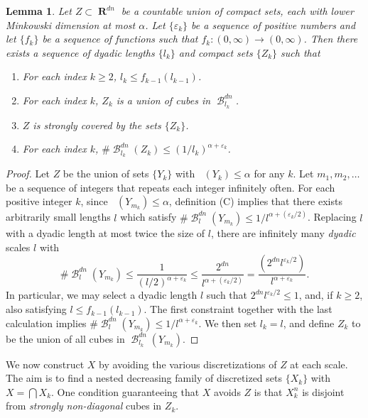 \documentclass[dvipsnames,letterpaper,12pt]{article}
\numberwithin{equation}{section}
\theoremstyle{plain}
\newtheorem{lemma}{Lemma}
\DeclareMathOperator{\lowminkdim}{\underline{\dim}_{\mathbf{M}}}
\DeclareMathOperator{\RR}{\mathbf{R}}
\DeclareMathOperator{\B}{\mathcal{B}}
\begin{document}
\begin{lemma} \label{coveringlemma}
	Let $Z \subset \RR^{dn}$ be a countable union of compact sets, each with lower Minkowski dimension at most $\alpha$. Let $\{ \varepsilon_k \}$ be a sequence of positive numbers and let $\{ f_k \}$ be a sequence of functions such that $f_k \colon (0,\infty) \to (0,\infty)$. Then there exists a sequence of dyadic lengths $\{ l_k \}$ and compact sets $\{ Z_k \}$ such that
	\begin{enumerate}
		\item For each index $k \geq 2$, $l_k \leq f_{k-1}(l_{k-1})$.
		\item For each index $k$, $Z_k$ is a union of cubes in $\B^{dn}_{l_k}$.
		\item $Z$ is strongly covered by the sets $\{ Z_k \}$.
		\item For each index $k$, $\# \B^{dn}_{l_k}(Z_k) \leq (1/l_k)^{\alpha + \varepsilon_k}$.
	\end{enumerate}
\end{lemma}
\begin{proof}
	Let $Z$ be the union of sets $\{ Y_k \}$ with $\lowminkdim(Y_k) \leq \alpha$ for any $k$. Let $m_1, m_2, \dots$ be a sequence of integers that repeats each integer infinitely often. For each positive integer $k$, since $\lowminkdim(Y_{m_k}) \leq \alpha$, definition (C) implies that there exists arbitrarily small lengths $l$ which satisfy $\# \B_l^{dn}(Y_{m_k}) \leq 1/l^{\alpha + (\varepsilon_k/2)}$. Replacing $l$ with a dyadic length at most twice the size of $l$, there are infinitely many {\it dyadic} scales $l$ with
	\[	\# \B^{dn}_l(Y_{m_k}) \leq \frac{1}{(l/2)^{\alpha + \varepsilon_k}} \leq \frac{2^{dn}}{l^{\alpha + (\varepsilon_k/2)}} = \frac{\left( 2^{dn} l^{\varepsilon_k/2} \right)}{l^{\alpha + \varepsilon_k}}. \]
	In particular, we may select a dyadic length $l$ such that $2^{dn} l^{\varepsilon_k/2} \leq 1$, and, if $k \geq 2$, also satisfying $l \leq f_{k-1}(l_{k-1})$. The first constraint together with the last calculation implies $\# \B^{dn}_l(Y_{m_k}) \leq 1/l^{\alpha + \varepsilon_k}$. We then set $l_k = l$, and define $Z_k$ to be the union of all cubes in $\B_{l_k}^{dn}(Y_{m_k})$.
\end{proof}

We now construct $X$ by avoiding the various discretizations of $Z$ at each scale. The aim is to find a nested decreasing family of discretized sets $\{ X_k \}$ with $X = \bigcap X_k$. One condition guaranteeing that $X$ avoids $Z$ is that $X_k^n$ is disjoint from {\it strongly non-diagonal} cubes in $Z_k$.
\end{document}
